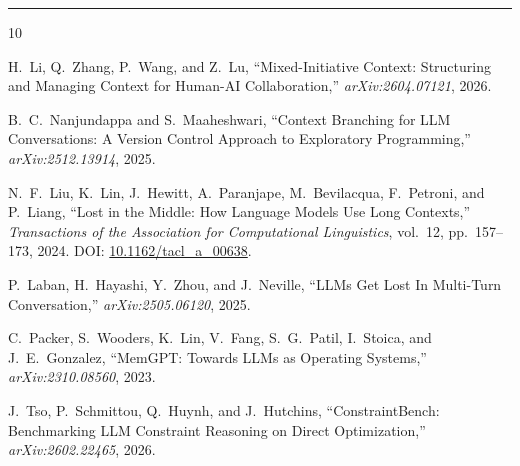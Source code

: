 \documentclass[10pt, a4paper]{article}
\begin{document}
\hrule\vspace{6pt}
\begin{thebibliography}{10}
\small

H.\ Li, Q.\ Zhang, P.\ Wang, and Z.\ Lu,
``Mixed-Initiative Context: Structuring and Managing Context for Human-AI Collaboration,''
\textit{arXiv:2604.07121}, 2026.

B.\ C.\ Nanjundappa and S.\ Maaheshwari,
``Context Branching for LLM Conversations: A Version Control Approach to Exploratory Programming,''
\textit{arXiv:2512.13914}, 2025.

N.\ F.\ Liu, K.\ Lin, J.\ Hewitt, A.\ Paranjape, M.\ Bevilacqua, F.\ Petroni, and P.\ Liang,
``Lost in the Middle: How Language Models Use Long Contexts,''
\textit{Transactions of the Association for Computational Linguistics}, vol.\ 12, pp.\ 157--173, 2024.
DOI: \href{https://doi.org/10.1162/tacl_a_00638}{10.1162/tacl\_a\_00638}.

P.\ Laban, H.\ Hayashi, Y.\ Zhou, and J.\ Neville,
``LLMs Get Lost In Multi-Turn Conversation,''
\textit{arXiv:2505.06120}, 2025.

C.\ Packer, S.\ Wooders, K.\ Lin, V.\ Fang, S.\ G.\ Patil, I.\ Stoica, and J.\ E.\ Gonzalez,
``MemGPT: Towards LLMs as Operating Systems,''
\textit{arXiv:2310.08560}, 2023.

J.\ Tso, P.\ Schmittou, Q.\ Huynh, and J.\ Hutchins,
``ConstraintBench: Benchmarking LLM Constraint Reasoning on Direct Optimization,''
\textit{arXiv:2602.22465}, 2026.

\end{thebibliography}
\end{document}

